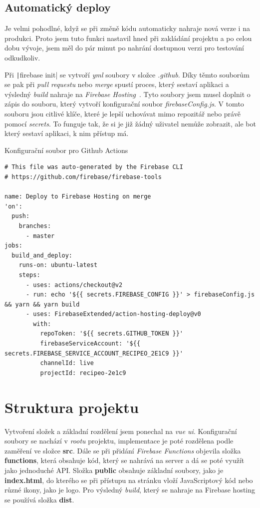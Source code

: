 \subsection{Automatický deploy}
Je velmi pohodlné, když se při změně kódu automaticky nahraje nová verze i na produkci. Proto jsem tuto funkci nastavil hned
při zakládání projektu a po celou dobu vývoje, jsem měl do pár minut po nahrání dostupnou verzi pro testování odkudkoliv.

Při \texttt|firebase init| se vytvoří \emph{yml} soubory v složce \emph{.github}. Díky těmto souborům se pak při
\emph{pull requestu} nebo \emph{merge} spustí proces, který sestaví aplikaci a výsledný \emph{build} nahraje na \emph{Firebase Hosting}~\cite{FirebaseHosting}.
Tyto soubory jsem musel doplnit o zápis do souboru, který vytvoří konfigurační soubor \emph{firebaseConfig.js}. V tomto souboru jsou citlivé klíče, které je lepší
uchovávat mimo repozitář nebo právě pomocí \emph{secrets}. To funguje tak, že si je již žádný uživatel nemůže zobrazit, ale bot který sestaví aplikaci, k nim
přístup má.


\begin{listing}[h]
    \caption{Konfigurační soubor pro Github Actions}
    \begin{verbatim}
# This file was auto-generated by the Firebase CLI
# https://github.com/firebase/firebase-tools

name: Deploy to Firebase Hosting on merge
'on':
  push:
    branches:
      - master
jobs:
  build_and_deploy:
    runs-on: ubuntu-latest
    steps:
      - uses: actions/checkout@v2
      - run: echo '${{ secrets.FIREBASE_CONFIG }}' > firebaseConfig.js && yarn && yarn build
      - uses: FirebaseExtended/action-hosting-deploy@v0
        with:
          repoToken: '${{ secrets.GITHUB_TOKEN }}'
          firebaseServiceAccount: '${{ secrets.FIREBASE_SERVICE_ACCOUNT_RECIPEO_2E1C9 }}'
          channelId: live
          projectId: recipeo-2e1c9
    \end{verbatim}
\end{listing}

\section{Struktura projektu}
Vytvoření složek a základní rozdělení jsem ponechal na \emph{vue ui}. Konfigurační soubory se nachází v \emph{rootu} projektu, implementace
je poté rozdělena podle zaměření ve složce \textbf{src}. Dále se při přidání \emph{Firebase Functions} objevila složka \textbf{functions}, která
obsahuje kód, který se nahrává na server a dá se poté využít jako jednoduché API. Složka \textbf{public} obsahuje základní soubory, jako je \textbf{index.html},
do kterého se při přístupu na stránku vloží JavaScriptový kód nebo různé ikony, jako je logo. Pro výsledný \emph{build}, který se nahraje na Firebase hosting se
používá složka \textbf{dist}.


